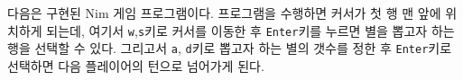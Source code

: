 
다음은 구현된 Nim 게임 프로그램이다. 프로그램을 수행하면 커서가 첫 행 맨 앞에
위치하게 되는데, 여기서 \texttt{w},\texttt{s}키로 커서를 이동한 후
\texttt{Enter}키를 누르면 별을 뽑고자 하는 행을 선택할 수 있다. 그리고서
\texttt{a}, \texttt{d}키로 뽑고자 하는 별의 갯수를 정한 후 \texttt{Enter}키로
선택하면 다음 플레이어의 턴으로 넘어가게 된다.


      